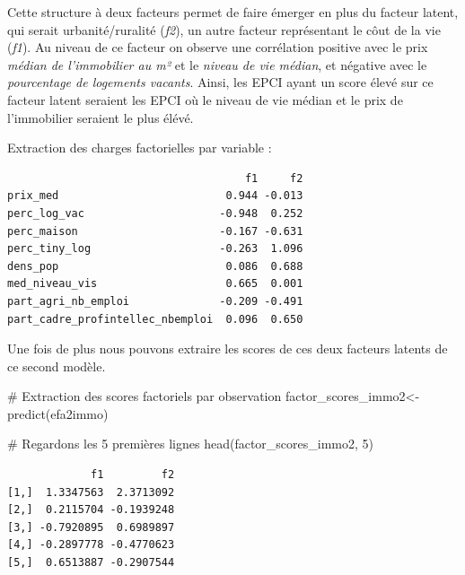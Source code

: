\documentclass[
  french,
  11pt,
  a4paper,
]{article}
\newenvironment{Shaded}{}{}
\newcommand{\CommentTok}[1]{\textcolor[rgb]{0.42,0.45,0.49}{#1}}
\newcommand{\DecValTok}[1]{\textcolor[rgb]{0.00,0.36,0.77}{#1}}
\newcommand{\FunctionTok}[1]{\textcolor[rgb]{0.44,0.26,0.76}{#1}}
\newcommand{\NormalTok}[1]{\textcolor[rgb]{0.14,0.16,0.18}{#1}}
\newcommand{\OtherTok}[1]{\textcolor[rgb]{0.44,0.26,0.76}{#1}}
\newcommand{\SpecialCharTok}[1]{\textcolor[rgb]{0.00,0.36,0.77}{#1}}
\begin{document}
Cette structure à deux facteurs permet de faire émerger en plus du
facteur latent, qui serait urbanité/ruralité (\emph{f2}), un autre
facteur représentant le côut de la vie (\emph{f1}). Au niveau de ce
facteur on observe une corrélation positive avec le prix \emph{médian de
l'immobilier au m²} et le \emph{niveau de vie médian}, et négative avec
le \emph{pourcentage de logements vacants}. Ainsi, les EPCI ayant un
score élevé sur ce facteur latent seraient les EPCI où le niveau de vie
médian et le prix de l'immobilier seraient le plus élévé.

Extraction des charges factorielles par variable :

\begin{Shaded}
\end{Shaded}

\begin{verbatim}
                                     f1     f2
prix_med                          0.944 -0.013
perc_log_vac                     -0.948  0.252
perc_maison                      -0.167 -0.631
perc_tiny_log                    -0.263  1.096
dens_pop                          0.086  0.688
med_niveau_vis                    0.665  0.001
part_agri_nb_emploi              -0.209 -0.491
part_cadre_profintellec_nbemploi  0.096  0.650
\end{verbatim}

Une fois de plus nous pouvons extraire les scores de ces deux facteurs
latents de ce second modèle.

\begin{Shaded}
\begin{Highlighting}[]
\CommentTok{\# Extraction des scores factoriels par observation}
\NormalTok{factor\_scores\_immo2}\OtherTok{\textless{}{-}}\FunctionTok{predict}\NormalTok{(efa2immo)}

\CommentTok{\# Regardons  les 5 premières lignes}
\FunctionTok{head}\NormalTok{(factor\_scores\_immo2, }\DecValTok{5}\NormalTok{)}
\end{Highlighting}
\end{Shaded}

\begin{verbatim}
             f1         f2
[1,]  1.3347563  2.3713092
[2,]  0.2115704 -0.1939248
[3,] -0.7920895  0.6989897
[4,] -0.2897778 -0.4770623
[5,]  0.6513887 -0.2907544
\end{verbatim}
\end{document}
